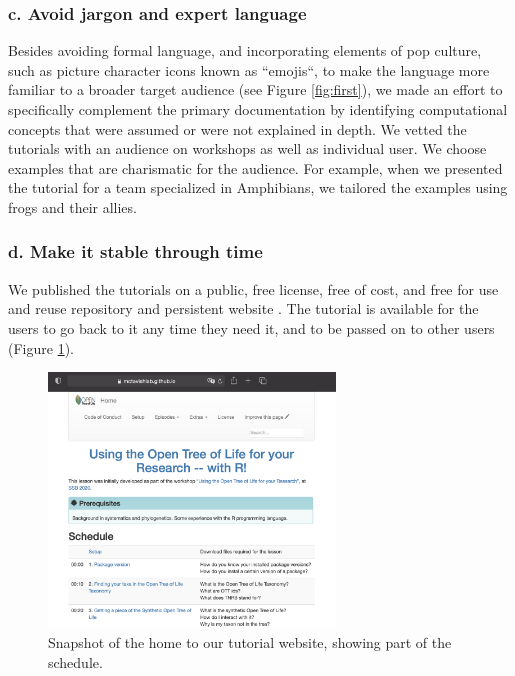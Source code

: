 \documentclass[12pt]{article}
\begin{document}
\subsubsection*{c. Avoid jargon and expert language}

Besides avoiding formal language, and incorporating elements of pop culture, such as picture
character icons known as ``emojis``, to make the language more familiar to a
broader target audience (see Figure \ref{fig:first}), we made an effort to specifically
complement the primary documentation by identifying
computational concepts that were assumed or were not explained in depth.
We vetted the tutorials with an audience on workshops as well as individual user.
We choose examples that are charismatic for the audience.
For example, when we presented the tutorial for a team specialized in Amphibians,
we tailored the examples using frogs and their allies.


\subsubsection*{d. Make it stable through time}

We published the tutorials on a public, free license, free of cost, and free for
use and reuse repository and persistent website \citep{RopentreeTutorials, RopentreeTutorialsWebsite}.
The tutorial is available for the users to go back to it any time they need it,
and to be passed on to other users (Figure \ref{fig:second}).

\begin{figure}
\begin{center}
\includegraphics[width=3in]{fig2.png}
\end{center}
\caption{Snapshot of the home to our tutorial website, showing part of the schedule. \label{fig:second}}
\end{figure}
\end{document}
